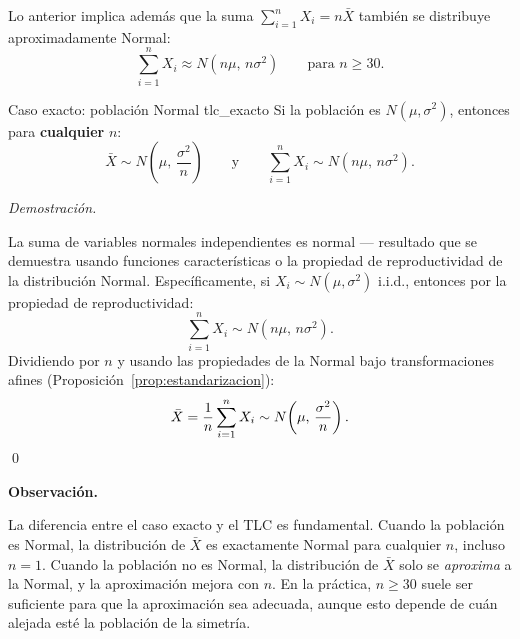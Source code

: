 \documentclass[12pt, a4paper]{book}
\newenvironment{observacion}{%
    \par\medskip\noindent\textbf{\color{azul}Observaci\'{o}n.}\enspace\itshape
}{\par\medskip}
\renewenvironment{proof}{%
    \par\medskip\noindent\textit{Demostraci\'{o}n.}\enspace
}{\qed\par\medskip}
\numberwithin{equation}{chapter}
\begin{document}
Lo anterior implica adem\'{a}s que la suma
$\sum_{i=1}^n X_i = n\bar{X}$ tambi\'{e}n se distribuye
aproximadamente Normal:
\[
\sum_{i=1}^n X_i \approx N(n\mu,\, n\sigma^2)
\qquad \text{para } n \geq 30.
\]

\begin{proposicion}{Caso exacto: poblaci\'{o}n Normal}
	{tlc_exacto}
	Si la poblaci\'{o}n es $N(\mu, \sigma^2)$, entonces
	para \textbf{cualquier} $n$:
	\[
	\bar{X} \sim N\!\left(\mu,\,\frac{\sigma^2}{n}
	\right)
	\qquad \text{y} \qquad
	\sum_{i=1}^n X_i \sim N(n\mu,\, n\sigma^2).
	\]
\end{proposicion}

\begin{proof}
	La suma de variables normales independientes es
	normal --- resultado que se demuestra usando funciones
	caracter\'{i}sticas o la propiedad de reproductividad
	de la distribuci\'{o}n Normal. Espec\'{i}ficamente,
	si $X_i \sim N(\mu, \sigma^2)$ i.i.d., entonces por
	la propiedad de reproductividad:
	\[
	\sum_{i=1}^n X_i \sim N(n\mu,\, n\sigma^2).
	\]
	Dividiendo por $n$ y usando las propiedades de la
	Normal bajo transformaciones afines
	(Proposici\'{o}n~\ref{prop:estandarizacion}):
	\[
	\bar{X} = \frac{1}{n}\sum_{i=1}^n X_i
	\sim N\!\left(\mu,\,\frac{\sigma^2}{n}\right).
	\qedhere
	\]
\end{proof}

\begin{observacion}
	La diferencia entre el caso exacto y el TLC es
	fundamental. Cuando la poblaci\'{o}n es Normal, la
	distribuci\'{o}n de $\bar{X}$ es exactamente Normal
	para cualquier $n$, incluso $n=1$. Cuando la
	poblaci\'{o}n no es Normal, la distribuci\'{o}n de
	$\bar{X}$ solo se \emph{aproxima} a la Normal, y
	la aproximaci\'{o}n mejora con $n$. En la pr\'{a}ctica,
	$n \geq 30$ suele ser suficiente para que la
	aproximaci\'{o}n sea adecuada, aunque esto depende
	de cu\'{a}n alejada est\'{e} la poblaci\'{o}n de
	la simetr\'{i}a.
\end{observacion}
\end{document}
